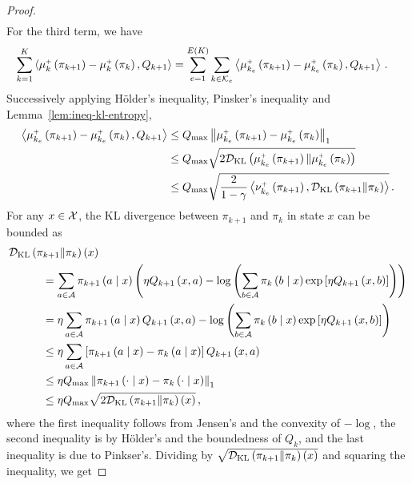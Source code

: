 \begin{proof}
\begin{align*}
    \end{align*}
    For the third term, we have
    \begin{align*}
        \sumkK \inp{\mu_k^\upplus \spr{\pi_{k+1}} - \mu_k^\upplus \spr{\pi_k}, Q_{k+1}} &= \sum_{e=1}^{E \spr{K}} \sum_{k \in \cK_e} \inp{\mu_{k_e}^\upplus \spr{\pi_{k+1}} - \mu_{k_e}^\upplus \spr{\pi_k}, Q_{k+1}}\,.
    \end{align*}
    Successively applying Hölder's inequality, Pinsker's inequality and Lemma~\ref{lem:ineq-kl-entropy},
    \begin{align*}
        \inp{\mu_{k_e}^\upplus \spr{\pi_{k+1}} - \mu_{k_e}^\upplus \spr{\pi_k}, Q_{k+1}} &\leq \QMAX \norm{\mu_{k_e}^\upplus \spr{\pi_{k+1}} - \mu_{k_e}^\upplus \spr{\pi_k}}_1 \\
        &\leq \QMAX \sqrt{2 \KL \spr{\mu_{k_e}^\upplus \spr{\pi_{k+1}} \| \mu_{k_e}^\upplus \spr{\pi_k}}} \\
        &\leq \QMAX \sqrt{\frac{2}{1 - \gamma} \inp{\nu_{k_e}^\upplus \spr{\pi_{k+1}}, \KL \spr{\pi_{k+1} \| \pi_k}}}\,.
    \end{align*}
    For any $x \in \cX$, the KL divergence between $\pi_{k+1}$ and $\pi_k$ in state $x$ can be bounded as
    \begin{align*}
        &\KL \spr{\pi_{k+1} \middle\| \pi_k} \spr{x} \\
        &\quad\quad\quad= \sum_{a \in \cA} \pi_{k+1} \spr{a \given x} \spr{\eta Q_{k+1} \spr{x, a} - \log \spr{\sum_{b \in \cA} \pi_k \spr{b \given x} \exp \sbr{\eta Q_{k+1} \spr{x, b}}}} \\
        &\quad\quad\quad= \eta \sum_{a \in \cA} \pi_{k+1} \spr{a \given x} Q_{k+1} \spr{x, a} - \log \spr{\sum_{b \in \cA} \pi_k \spr{b \given x} \exp \sbr{\eta Q_{k+1} \spr{x, b}}} \\
        &\quad\quad\quad\leq \eta \sum_{a \in \cA} \sbr{\pi_{k+1} \spr{a \given x} - \pi_k \spr{a \given x}} Q_{k+1} \spr{x, a} \\
        &\quad\quad\quad\leq \eta \QMAX \norm{\pi_{k+1} \spr{\cdot \given x} - \pi_k \spr{\cdot \given x}}_1 \\
        &\quad\quad\quad\leq \eta \QMAX \sqrt{2 \KL \spr{\pi_{k+1} \middle\| \pi_k} \spr{x}}\,,
    \end{align*}
    where the first inequality follows from Jensen's and the convexity of $- \log$, the second inequality is by Hölder's and the boundedness of $Q_k$, and the last inequality is due to Pinkser's. Dividing by $\sqrt{\KL \spr{\pi_{k+1} \middle\| \pi_k} \spr{x}}$ and squaring the inequality, we get

\end{proof}
